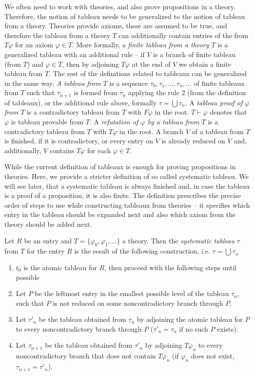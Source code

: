We often need to work with theories, and also prove propositions in a theory. Therefore, the notion of tableau needs to be generalized to the notion of tableau from a theory. Theories provide axioms, these are assumed to be true, and therefore the tableau from a theory $T$ can additionally contain entries of the from $T \varphi$ for an axiom $\varphi \in T$. More formally, a \emph{finite tableau from a theory $T$} is a generalized tableau with an additional rule -- if $V$ is a branch of finite tableau (from $T$) and $\varphi \in T$, then by adjoining $T \varphi$ at the end of $V$ we obtain a finite tableau from $T$. The rest of the definitions related to tableaux can be generalized in the same way. \emph{A tableau from $T$} is a sequence $\tau_0, \tau_1, \dots, \tau_n, \dots$ of finite tableaux from $T$ such that $\tau_{n+1}$ is formed from $\tau_n$ applying the rule 2 (from the definition of tableaux), or the additional rule above, formally $\tau = \bigcup \tau_n$. A \emph{tableau proof of $\varphi$ from $T$} is a contradictory tableau from $T$ with $F \varphi$ in the root. $T \vdash \varphi$ denotes that $\varphi$ is tableau provable from $T$. A \emph{refutation of $\varphi$ by a tableau from $T$} is a contradictory tableau from $T$ with $T \varphi$ in the root. A branch $V$ of a tableau from $T$ is finished, if it is contradictory, or every entry on $V$ is already reduced on $V$ and, additionally, $V$ contains $T \varphi$ for each $\varphi \in T$.

While the current definition of tableaux is enough for proving propositions in theories. Here, we provide a stricter definition of so called systematic tableau. We will see later, that a systematic tableau is always finished and, in case the tableau is a proof of a proposition, it is also finite. The definition prescribes the precise order of steps to use while constructing tableaux from theories -- it specifies which entry in the tableau should be expanded next and also which axiom from the theory should be added next.

\begin{definition}
Let $R$ be an entry and $T = \{\varphi_0, \varphi_1, \dots\}$ a theory. Then the \emph{systematic tableau} $\tau$ from $T$ for the entry $R$ is the result of the following construction, i.e. $\tau = \bigcup \tau_n$
\begin{enumerate}
	\item $t_0$ is the atomic tableau for $R$, then proceed with the following steps until possible
	\item Let $P$ be the leftmost entry in the smallest possible level of the tableau $\tau_n$, such that $P$ is not reduced on some noncontradictory branch through $P$.
	\item Let $\tau'_n$ be the tableau obtained from $\tau_n$ by adjoining the atomic tableau for $P$ to every noncontradictory branch through $P$ ($\tau'_n = \tau_n$ if no such $P$ exists).
	\item Let $\tau_{n+1}$ be the tableau obtained from $\tau'_n$ by adjoining $T \varphi_n$ to every noncontradictory branch that does not contain $T \varphi_n$ (if $\varphi_n$ does not exist, $\tau_{n+1}=\tau'_n$).
\end{enumerate}
\end{definition}

